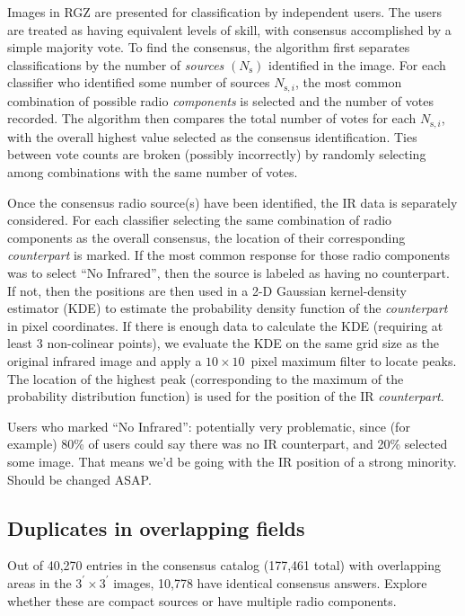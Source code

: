 \documentclass[a4,useAMS,usenatbib]{mn2e}
\begin{document}
Images in RGZ are presented for classification by independent users. The users are treated as having equivalent levels of skill, with consensus accomplished by a simple majority vote. To find the consensus, the algorithm first separates classifications by the number of \emph{sources} $(N_\mathrm{s})$ identified in the image. For each classifier who identified some number of sources $N_{\mathrm{s},i}$, the most common combination of possible radio \emph{components} is selected and the number of votes recorded. The algorithm then compares the total number of votes for each $N_{\mathrm{s},i}$, with the overall highest value selected as the consensus identification. Ties between vote counts are broken {\note (possibly incorrectly)} by randomly selecting among combinations with the same number of votes.

Once the consensus radio source(s) have been identified, the IR data is separately considered. For each classifier selecting the same combination of radio components as the overall consensus, the location of their corresponding \emph{counterpart} is marked. If the most common response for those radio components was to select ``No Infrared'', then the source is labeled as having no counterpart. If not, then the positions are then used in a 2-D Gaussian kernel-density estimator (KDE) to estimate the probability density function of the \emph{counterpart} in pixel coordinates. If there is enough data to calculate the KDE (requiring at least 3 non-colinear points), we evaluate the KDE on the same grid size as the original infrared image and apply a $10\times10$~pixel maximum filter to locate peaks. The location of the highest peak (corresponding to the maximum of the probability distribution function) is used for the position of the IR \emph{counterpart}. 

{\note Users who marked ``No Infrared'': potentially very problematic, since (for example) 80\% of users could say there was no IR counterpart, and 20\% selected some image. That means we'd be going with the IR position of a strong minority. Should be changed ASAP.}

\subsection{Duplicates in overlapping fields}

Out of 40,270 entries in the consensus catalog (177,461 total) with overlapping areas in the $3^\prime\times3^\prime$ images, 10,778 have identical consensus answers. {\note Explore whether these are compact sources or have multiple radio components.} %
\end{document}

